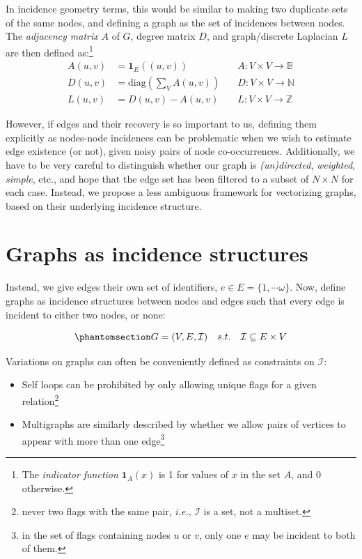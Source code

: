 \documentclass[%
	12pt,
		oneside,
		letterpaper
]{book}
\providecommand{\tightlist}{%
  \setlength{\itemsep}{0pt}\setlength{\parskip}{0pt}}\usepackage{longtable,booktabs,array}
\begin{document}
In incidence geometry terms, this would be similar to making two
duplicate sets of the same nodes, and defining a graph as the set of
incidences between nodes. The \emph{adjacency matrix} \(A\) of \(G\),
degree matrix \(D\), and graph/discrete Laplacian \(L\) are then defined
as:\footnote{ The \emph{indicator function} \(\mathbf{1}_A(x)\) is 1 for
  values of \(x\) in the set \(A\), and 0 otherwise.} \[
\begin{aligned}
A(u,v) & =\mathbf{1}_E((u,v)) \quad &A : V\times V\rightarrow \mathbb{B} \\
D(u,v) & =\mathrm{diag}({\textstyle\sum}_V A(u,v))\quad &D : V\times V\rightarrow \mathbb{N} \\
L(u,v) & = D(u,v) - A(u,v) \quad &L : V\times V\rightarrow \mathbb{Z} 
\end{aligned}
\]

However, if edges and their recovery is so important to us, defining
them explicitly as nodes-node incidences can be problematic when we wish
to estimate edge existence (or not), given noisy pairs of node
co-occurrences. Additionally, we have to be very careful to distinguish
whether our graph is \emph{(un)directed}, \emph{weighted},
\emph{simple}, etc., and hope that the edge set has been filtered to a
subset of \(N\times N\) for each case. Instead, we propose a less
ambiguous framework for vectorizing graphs, based on their underlying
incidence structure.

\section{Graphs as incidence structures}\label{sec-incidence-vec}

Instead, we give edges their own set of identifiers,
\(e\in E=\{1,\cdots \omega\}\). Now, define graphs as incidence
structures between nodes and edges such that every edge is incident to
either two nodes, or none:

\begin{equation}\phantomsection\label{eq-simple-incidence}{
G = (V,E,\mathcal{I}) \quad s.t. \quad \mathcal{I} \subseteq E\times V
}\end{equation}

Variations on graphs can often be conveniently defined as constraints on
\(\mathcal{I}\):

\begin{itemize}
\tightlist
\item
  Self loops can be prohibited by only allowing unique flags for a given
  relation\footnote{ never two flags with the same pair, \emph{i.e.},
    \(\mathcal{I}\) is a set, not a multiset.}
\item
  Multigraphs are similarly described by whether we allow pairs of
  vertices to appear with more than one edge\footnote{ in the set of
    flags containing nodes \(u\) or \(v\), only one \(e\) may be
    incident to both of them.}
\end{itemize}
\end{document}
